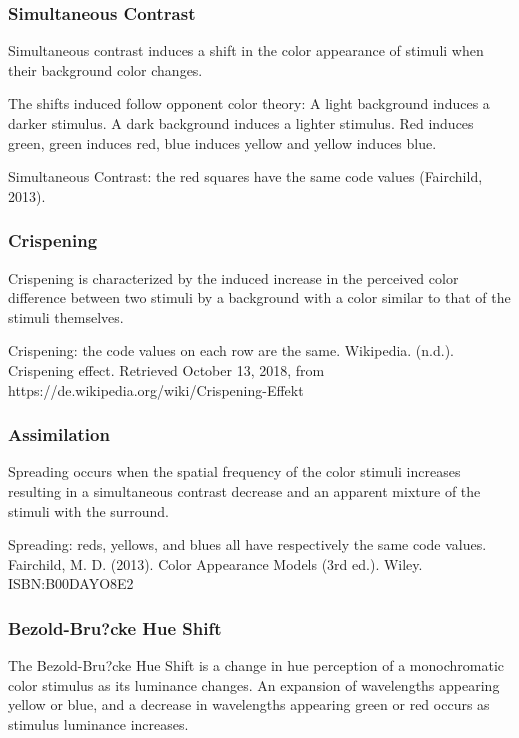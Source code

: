 \subsubsection{Simultaneous Contrast}%
\label{subsubsec:simultaneous-contrast}
Simultaneous contrast induces a shift in the color appearance of stimuli when their background color changes.

The shifts induced follow opponent color theory:
A light background induces a darker stimulus.
A dark background induces a lighter stimulus.
Red induces green, green induces red, blue induces yellow and yellow induces blue.

Simultaneous Contrast: the red squares have the same code values (Fairchild, 2013).

\subsubsection{Crispening}%
\label{subsubsec:crispening}

Crispening is characterized by the induced increase in the perceived color difference between two stimuli by a background with a color similar to that of the stimuli themselves.

Crispening: the code values on each row are the same.
Wikipedia. (n.d.). Crispening effect. Retrieved October 13, 2018, from https://de.wikipedia.org/wiki/Crispening-Effekt

\subsubsection{Assimilation}%
\label{subsubsec:assimilation}

Spreading occurs when the spatial frequency of the color stimuli increases resulting in a simultaneous contrast decrease and an apparent mixture of the stimuli with the surround.

Spreading: reds, yellows, and blues all have respectively the same code values.
Fairchild, M. D. (2013). Color Appearance Models (3rd ed.). Wiley. ISBN:B00DAYO8E2

\subsubsection{Bezold-Bru?cke Hue Shift}%
\label{subsubsec:bezold-brucke-hue-shift}

The Bezold-Bru?cke Hue Shift is a change in hue perception of a monochromatic color stimulus as its luminance changes. An expansion of wavelengths appearing yellow or blue, and a decrease in wavelengths appearing green or red occurs as stimulus luminance increases.

